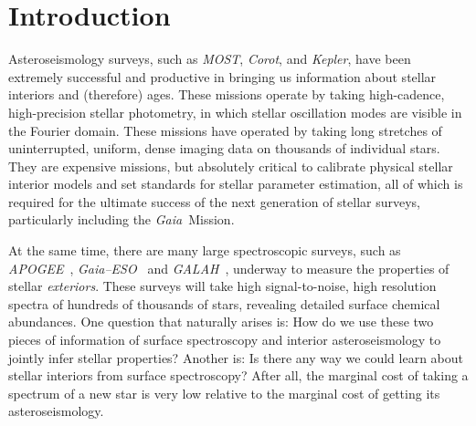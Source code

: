 \documentclass[12pt, preprint]{aastex}
\newcommand{\project}[1]{\textsl{#1}}
\newcommand{\apogee}{\project{APOGEE}}
\newcommand{\corot}{\project{Corot}}
\newcommand{\kepler}{\project{Kepler}}
\newcommand{\gaia}{\project{Gaia}}
\newcommand{\gaiaeso}{\project{Gaia--ESO}}
\newcommand{\galah}{\project{GALAH}}
\newcommand{\most}{\project{MOST}}
\begin{document}

%
%

\section{Introduction}\label{sec:Intro}

Asteroseismology surveys, such as \most, \corot, and \kepler, have
been extremely successful and productive in bringing us information
about stellar interiors and (therefore) ages.
These missions operate by taking high-cadence, high-precision stellar
photometry, in which stellar oscillation modes are visible in the
Fourier domain.
These missions have operated by taking long stretches of
uninterrupted, uniform, dense imaging data on thousands of individual
stars.
They are expensive missions, but absolutely critical to calibrate
physical stellar interior models and set standards for stellar
parameter estimation, all of which is required for the ultimate
success of the next generation of stellar surveys, particularly
including the \gaia\ Mission.

At the same time, there are many large spectroscopic surveys, such
as \apogee\ \citep{Majewski2012}, \gaiaeso\ \citep{Gilmore2012} and \galah\ \citep{Freeman2012}, underway to measure the properties
of stellar \emph{exteriors}.
These surveys will take high signal-to-noise, high resolution spectra
of hundreds of thousands of stars, revealing detailed surface chemical
abundances.
One question that naturally arises is:
How do we use these two pieces of information of surface spectroscopy
and interior asteroseismology to jointly infer stellar properties?
Another is:
Is there any way we could learn about stellar interiors from surface
spectroscopy?
After all, the marginal cost of taking a spectrum of
a new star is very low relative to the marginal cost of getting its
asteroseismology.
\end{document}
